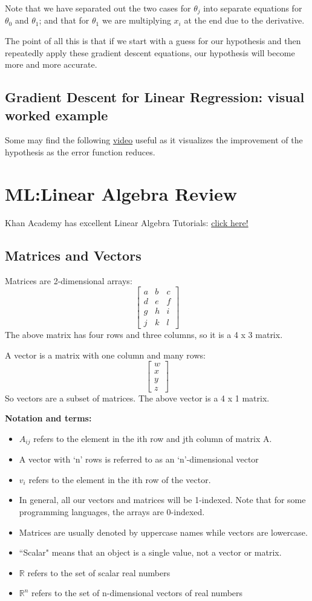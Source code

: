 Note that we have separated out the two cases for $\theta_j$ into separate equations for $\theta_0 $ and $\theta_1$; and that for $\theta_1$ we are multiplying $x_{i}$ at the end due to the derivative.

The point of all this is that if we start with a guess for our hypothesis and then repeatedly apply these gradient descent equations, our hypothesis will become more and more accurate.
\subsection{Gradient Descent for Linear Regression: visual worked example}
Some may find the following \href{https://www.youtube.com/watch?v=WnqQrPNYz5Q}{video} useful as it visualizes the improvement of the hypothesis as the error function reduces.
\section{ML:Linear Algebra Review}
Khan Academy has excellent Linear Algebra Tutorials: \href{https://www.khanacademy.org/#linear-algebra}{click here!}
\subsection{Matrices and Vectors}
Matrices are 2-dimensional arrays:
\[
\begin{bmatrix}  
a & b & c \\   
d & e & f \\   
g & h & i \\   
j & k & l
\end{bmatrix}
\]
The above matrix has four rows and three columns, so it is a 4 x 3 matrix.

A vector is a matrix with one column and many rows:
\[
\begin{bmatrix}  
w \\  
x \\
y \\
z 
\end{bmatrix}
\]
So vectors are a subset of matrices. The above vector is a 4 x 1 matrix.

{\bf Notation and terms:}
\begin{itemize}
	\item $A_{ij}$ refers to the element in the ith row and jth column of matrix A.
	\item A vector with `n' rows is referred to as an `n'-dimensional vector
	\item $v_i$ refers to the element in the ith row of the vector.
	\item In general, all our vectors and matrices will be 1-indexed. Note that for some programming languages, the arrays are 0-indexed.
	\item Matrices are usually denoted by uppercase names while vectors are lowercase.
	\item ``Scalar" means that an object is a single value, not a vector or matrix.
	\item $\mathbb{R}$ refers to the set of scalar real numbers
	\item $\mathbb{R}^n$ refers to the set of n-dimensional vectors of real numbers
\end{itemize}
